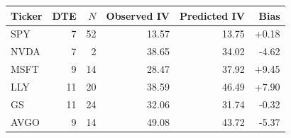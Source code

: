\begin{tabular}{lrrrrr}
\toprule
Ticker & DTE & $N$ & Observed IV & Predicted IV & Bias \\
\midrule
SPY & 7 & 52 & 13.57 & 13.75 & +0.18 \\
NVDA & 7 & 2 & 38.65 & 34.02 & -4.62 \\
MSFT & 9 & 14 & 28.47 & 37.92 & +9.45 \\
LLY & 11 & 20 & 38.59 & 46.49 & +7.90 \\
GS & 11 & 24 & 32.06 & 31.74 & -0.32 \\
AVGO & 9 & 14 & 49.08 & 43.72 & -5.37 \\
\bottomrule\end{tabular}

